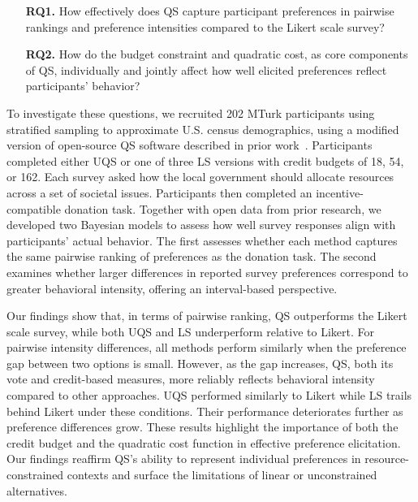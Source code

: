 \begin{itemize}
    \item [\textbf{RQ1.}] How effectively does QS capture participant preferences in pairwise rankings and preference intensities compared to the Likert scale survey?
    \item [\textbf{RQ2.}] How do the budget constraint and quadratic cost, as core components of QS, individually and jointly affect how well elicited preferences reflect participants' behavior?
\end{itemize}


To investigate these questions, we recruited 202 MTurk participants using stratified sampling to approximate U.S. census demographics, using a modified version of open-source QS software described in prior work~\cite{chengCanShowWhat2021}. Participants completed either UQS or one of three LS versions with credit budgets of 18, 54, or 162. Each survey asked how the local government should allocate resources across a set of societal issues. Participants then completed an incentive-compatible donation task. Together with open data from prior research, we developed two Bayesian models to assess how well survey responses align with participants' actual behavior. The first assesses whether each method captures the same pairwise ranking of preferences as the donation task. The second examines whether larger differences in reported survey preferences correspond to greater behavioral intensity, offering an interval-based perspective.

Our findings show that, in terms of pairwise ranking, QS outperforms the Likert scale survey, while both UQS and LS underperform relative to Likert. For pairwise intensity differences, all methods perform similarly when the preference gap between two options is small. However, as the gap increases, QS, both its vote and credit-based measures, more reliably reflects behavioral intensity compared to other approaches. UQS performed similarly to Likert while LS trails behind Likert under these conditions. Their performance deteriorates further as preference differences grow. These results highlight the importance of both the credit budget and the quadratic cost function in effective preference elicitation. Our findings reaffirm QS's ability to represent individual preferences in resource-constrained contexts and surface the limitations of linear or unconstrained alternatives.

